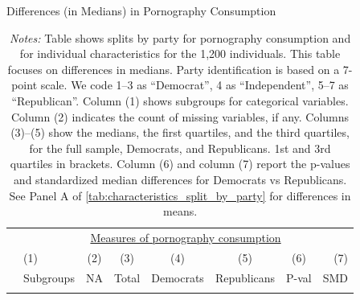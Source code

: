 \documentclass[12pt, letterpaper]{article}
\begin{document}
\begin{table}[ht] \centering \small \setlength\tabcolsep{5 pt}
	\caption{Differences (in Medians) in Pornography Consumption}
	\label{tab:characteristics_split_by_party_medians}
	\begin{adjustbox}{max width=\textwidth}
		\begin{tabular}{@{\hspace{0\tabcolsep}}llrcccrr@{\hspace{0\tabcolsep}}}
			\toprule
			&\multicolumn{7}{c}{\underline{Measures of pornography consumption}}\\
			&\multicolumn{1}{l}{(1)}&\multicolumn{1}{c}{(2)}&\multicolumn{1}{c}{(3)}&\multicolumn{1}{c}{(4)}&\multicolumn{1}{c}{(5)}&\multicolumn{1}{c}{(6)}&\multicolumn{1}{r}{(7)}\\			
			&\multicolumn{1}{l}{Subgroups}&\multicolumn{1}{c}{NA}&\multicolumn{1}{c}{Total}&\multicolumn{1}{c}{Democrats}&\multicolumn{1}{c}{Republicans}&\multicolumn{1}{c}{P-val}&\multicolumn{1}{r}{SMD}\\
			\cmidrule{2-8}
			\\
			\bottomrule
		\end{tabular}
	\end{adjustbox}
	\caption*{\scriptsize \emph{Notes:}
		Table shows splits by party for pornography consumption and for individual characteristics for the 1,200 individuals.
		This table focuses on differences in medians.
		Party identification is based on a 7-point scale. We code 1--3 as ``Democrat'', 4 as ``Independent'', 5--7 as ``Republican''.
		Column (1) shows subgroups for categorical variables.
		Column (2) indicates the count of missing variables, if any.
		Columns (3)--(5) show the medians, the first quartiles, and the third quartiles, for the full sample, Democrats, and Republicans.
		1st and 3rd quartiles in brackets.
		Column (6) and column (7) report the p-values and standardized median differences for Democrats vs Republicans.
		See Panel A of \cref{tab:characteristics_split_by_party} for differences in means.
	}
\end{table}
\end{document}
